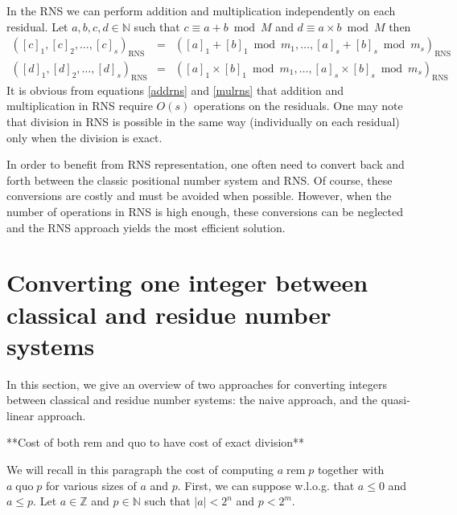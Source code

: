 \documentclass[acmtoms]{acmsmall}
\def\N{\mathbb{N}}
\def\Z{\mathbb{Z}}
\newcommand{\tmop}[1]{\ensuremath{\operatorname{#1}}}
\newcommand{\rem}{\tmop{rem}}
\newcommand{\quo}{\tmop{quo}}
\begin{document}
In the RNS we can perform addition and multiplication independently on each residual.  Let
$a,b,c,d \in \N$ such that $c\equiv a + b \bmod M$ and $d \equiv a \times b \bmod M$ then
\begin{eqnarray}
	\label{addrns}
	([c]_1,[c]_2,\dots,[c]_s)_{\text{RNS}} &=& ([a]_1+[b]_1 \bmod m_1,\dots, [a]_s+[b]_s \bmod
	m_s)_{\text{RNS}}\\
	\label{mulrns}
	([d]_1,[d]_2,\dots,[d]_s)_{\text{RNS}} &=& ([a]_1\times 
	[b]_1 \bmod m_1,\dots, [a]_s\times [b]_s \bmod m_s)_{\text{RNS}} 
\end{eqnarray}
It is obvious from equations \ref{addrns} and \ref{mulrns} that addition and
multiplication in RNS require $O(s)$ operations on the residuals. One may
note that division in RNS is possible in the same way (individually on each
residual) only when the division is exact.

In order to benefit from RNS representation, one often need to convert back and
forth between the classic positional number system and RNS. Of course, these
conversions are costly and must be avoided when possible. However, when the
number of operations in RNS is high enough, these conversions can be neglected
and the RNS approach yields the most efficient solution.






\section{Converting one integer between classical and residue number systems}
\label{sec:ConvRNS}

In this section, we give an overview of two approaches for converting integers between classical and
residue number systems: the naive approach, and the quasi-linear approach.

\medskip
**Cost of both rem and quo to have cost of exact division**

We will recall in this paragraph the cost of computing $a \rem p$
together with $a \quo p$ for various sizes of $a$ and $p$. First, we can suppose w.l.o.g. that
$a \le 0$ and $a \le p$. Let $a \in\Z$ and $p \in \N$ such that $|a|<2^n$ and $p<2^m$.
\end{document}
